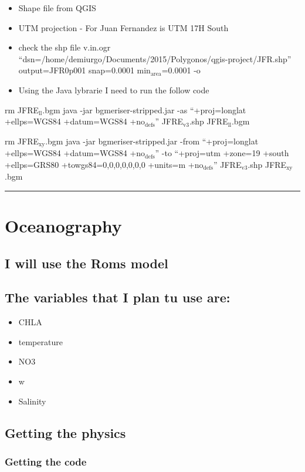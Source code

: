 \documentclass[11pt]{article}
\begin{document}
\begin{itemize}
\item Shape file from QGIS
\item UTM projection - For Juan Fernandez is UTM 17H South
\item check the shp file
   v.in.ogr ``dsn=/home/demiurgo/Documents/2015/Polygonos/qgis-project/JFR.shp'' output=JFR0p001 snap=0.0001 min$_{\mathrm{area}}$=0.0001 -o
\item Using the Java lybrarie I need to run the follow code
\end{itemize}
rm JFRE$_{\mathrm{ll}}$.bgm
java -jar bgmeriser-stripped.jar -as ``+proj=longlat +ellps=WGS84 +datum=WGS84 +no$_{\mathrm{defs}}$'' JFRE$_{\mathrm{v3}}$.shp JFRE$_{\mathrm{ll}}$.bgm

rm JFRE$_{\mathrm{xy}}$.bgm
java -jar bgmeriser-stripped.jar -from ``+proj=longlat +ellps=WGS84 +datum=WGS84 +no$_{\mathrm{defs}}$''  -to ``+proj=utm +zone=19 +south +ellps=GRS80 +towgs84=0,0,0,0,0,0,0 +units=m +no$_{\mathrm{defs}}$'' JFRE$_{\mathrm{v3}}$.shp JFRE$_{\mathrm{xy}}$.bgm

\hrule
\section*{Oceanography}
\label{sec-4}
\subsection*{I will use the Roms model}
\label{sec-4-1}
\subsection*{The variables that I plan tu use are:}
\label{sec-4-2}

\begin{itemize}
\item CHLA
\item temperature
\item NO3
\item w
\item Salinity
\end{itemize}
\subsection*{Getting the physics}
\label{sec-4-3}
\subsubsection*{Getting the code}
\label{sec-4-3-1}
\end{document}
